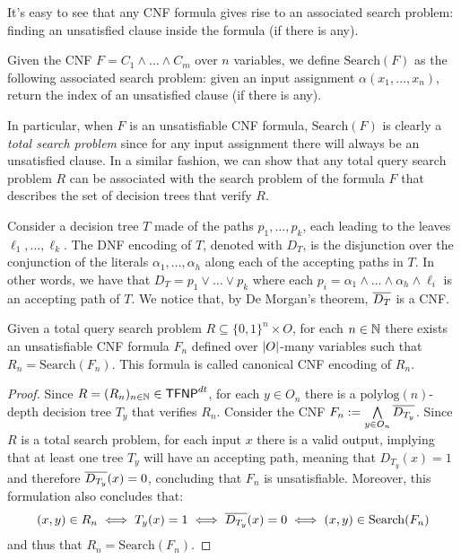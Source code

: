 
It's easy to see that any CNF formula gives rise to an associated search problem: finding an unsatisfied clause inside the formula (if there is any).

\begin{definition}
    Given the CNF $F = C_1 \land \ldots \land C_m$ over $n$ variables, we define  $\mathrm{Search}(F)$ as the following associated search problem: given an input assignment $\alpha(x_1, \ldots, x_n)$, return the index of an unsatisfied clause (if there is any).
\end{definition}

In particular, when $F$ is an unsatisfiable CNF formula, $\mathrm{Search}(F)$ is clearly a \textit{total search problem} since for any input assignment there will always be an unsatisfied clause. In a similar fashion, we can show that any total query search problem $R$ can be associated with the search problem of the formula $F$ that describes the set of decision trees that verify $R$.

Consider a decision tree $T$ made of the paths $p_1, \ldots, p_k$, each leading to the leaves $\ell_1, \ldots, \ell_k$. The DNF encoding of $T$, denoted with $D_T$, is the disjunction over the conjunction of the literals $\alpha_1, \ldots, \alpha_h$ along each of the accepting paths in $T$. In other words, we have that $D_T = p_1 \lor \ldots \lor p_k$ where each $p_i = \alpha_1 \land \ldots \land \alpha_h \land \ell_i$ is an accepting path of $T$. We notice that, by De Morgan's theorem, $\overline{D_T}$ is a CNF.

\begin{proposition}
    \label{Rdt = Search(F)}
    Given a total query search problem $R \subseteq \{0,1\}^n \times O$, for each $n \in \mathbb{N}$ there exists an unsatisfiable CNF formula $F_n$ defined over $\left|O\right|$-many variables such that $R_n = \mathrm{Search}(F_n)$. This formula is called canonical CNF encoding of $R_n$.
\end{proposition}

\begin{proof}
    Since $R = (R_n)_{n \in \mathbb{N}} \in \textsf{TFNP}^{dt}$, for each $y \in O_n$ there is a $\mathrm{polylog}(n)$-depth decision tree $T_y$ that verifies $R_n$. Consider the CNF $F_n := \bigwedge\limits_{y \in O_n} \overline{D_{T_y}}$. Since $R$ is a total search problem, for each input $x$ there is a valid output, implying that at least one tree $T_y$ will have an accepting path, meaning that $D_{T_y}(x) = 1$ and therefore $\overline{D_{T_y}}(x) = 0$, concluding that $F_n$ is unsatisfiable. Moreover, this formulation also concludes that:
    \[(x,y) \in R_n \iff T_y(x) = 1 \iff \overline{D_{T_y}}(x) = 0 \iff (x,y) \in \mathrm{Search}(F_n)\]
    and thus that $R_n = \mathrm{Search}(F_n)$.

\end{proof}

